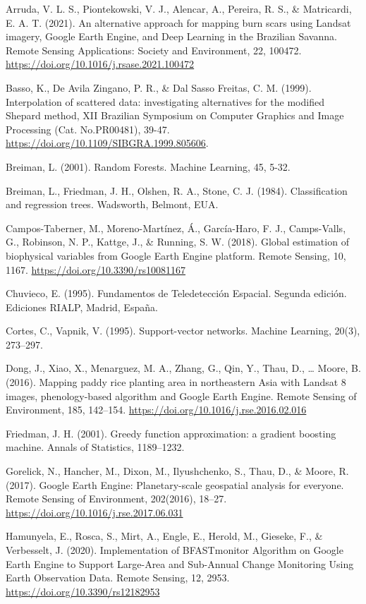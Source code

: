 \documentclass[
  12pt,
  letterpaper,
  twoside]{book}
\begin{document}
Arruda, V. L. S., Piontekowski, V. J., Alencar, A., Pereira, R. S., \& Matricardi, E. A. T. (2021). An alternative approach for mapping burn scars using Landsat imagery, Google Earth Engine, and Deep Learning in the Brazilian Savanna. Remote Sensing Applications: Society and Environment, 22, 100472. \url{https://doi.org/10.1016/j.rsase.2021.100472}

Basso, K., De Avila Zingano, P. R., \& Dal Sasso Freitas, C. M. (1999). Interpolation of scattered data: investigating alternatives for the modified Shepard method, XII Brazilian Symposium on Computer Graphics and Image Processing (Cat. No.PR00481), 39-47. \url{https://doi.org/10.1109/SIBGRA.1999.805606}.

Breiman, L. (2001). Random Forests. Machine Learning, 45, 5-32.

Breiman, L., Friedman, J. H., Olshen, R. A., Stone, C. J. (1984). Classification and regression trees. Wadsworth, Belmont, EUA.

Campos-Taberner, M., Moreno-Martínez, Á., García-Haro, F. J., Camps-Valls, G., Robinson, N. P., Kattge, J., \& Running, S. W. (2018). Global estimation of biophysical variables from Google Earth Engine platform. Remote Sensing, 10, 1167. \url{https://doi.org/10.3390/rs10081167}

Chuvieco, E. (1995). Fundamentos de Teledetección Espacial. Segunda edición. Ediciones RIALP, Madrid, España.

Cortes, C., Vapnik, V. (1995). Support-vector networks. Machine Learning, 20(3), 273--297.

Dong, J., Xiao, X., Menarguez, M. A., Zhang, G., Qin, Y., Thau, D., \ldots{} Moore, B. (2016). Mapping paddy rice planting area in northeastern Asia with Landsat 8 images, phenology-based algorithm and Google Earth Engine. Remote Sensing of Environment, 185, 142--154. \url{https://doi.org/10.1016/j.rse.2016.02.016}

Friedman, J. H. (2001). Greedy function approximation: a gradient boosting machine. Annals of Statistics, 1189--1232.

Gorelick, N., Hancher, M., Dixon, M., Ilyushchenko, S., Thau, D., \& Moore, R. (2017). Google Earth Engine: Planetary-scale geospatial analysis for everyone. Remote Sensing of Environment, 202(2016), 18--27. \url{https://doi.org/10.1016/j.rse.2017.06.031}

Hamunyela, E., Rosca, S., Mirt, A., Engle, E., Herold, M., Gieseke, F., \& Verbesselt, J. (2020). Implementation of BFASTmonitor Algorithm on Google Earth Engine to Support Large-Area and Sub-Annual Change Monitoring Using Earth Observation Data. Remote Sensing, 12, 2953. \url{https://doi.org/10.3390/rs12182953}
\end{document}
